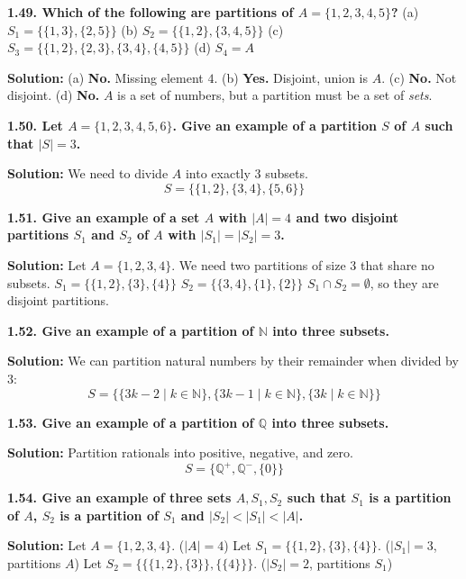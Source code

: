 \documentclass[12pt]{article}
\begin{document}
\hrulefill

\textbf{1.49. Which of the following are partitions of $A = \{1, 2, 3, 4, 5\}$?}
(a) $S_1 = \{\{1, 3\}, \{2, 5\}\}$ \quad (b) $S_2 = \{\{1, 2\}, \{3, 4, 5\}\}$
(c) $S_3 = \{\{1, 2\}, \{2, 3\}, \{3, 4\}, \{4, 5\}\}$ \quad (d) $S_4 = A$

\textbf{Solution:}
(a) \textbf{No.} Missing element $4$.
(b) \textbf{Yes.} Disjoint, union is $A$.
(c) \textbf{No.} Not disjoint.
(d) \textbf{No.} $A$ is a set of numbers, but a partition must be a set of \textit{sets}.

\hrulefill

\textbf{1.50. Let $A = \{1, 2, 3, 4, 5, 6\}$. Give an example of a partition $S$ of $A$ such that $|S| = 3$.}

\textbf{Solution:}
We need to divide $A$ into exactly 3 subsets. 
\[ S = \{\{1, 2\}, \{3, 4\}, \{5, 6\}\} \]

\hrulefill

\textbf{1.51. Give an example of a set $A$ with $|A| = 4$ and two disjoint partitions $S_1$ and $S_2$ of $A$ with $|S_1| = |S_2| = 3$.}

\textbf{Solution:}
Let $A = \{1, 2, 3, 4\}$. We need two partitions of size 3 that share no subsets.
$S_1 = \{\{1, 2\}, \{3\}, \{4\}\}$
$S_2 = \{\{3, 4\}, \{1\}, \{2\}\}$
$S_1 \cap S_2 = \emptyset$, so they are disjoint partitions.

\hrulefill

\textbf{1.52. Give an example of a partition of $\mathbb{N}$ into three subsets.}

\textbf{Solution:}
We can partition natural numbers by their remainder when divided by 3:
\[ S = \{\{3k-2 \mid k \in \mathbb{N}\}, \{3k-1 \mid k \in \mathbb{N}\}, \{3k \mid k \in \mathbb{N}\}\} \]

\hrulefill

\textbf{1.53. Give an example of a partition of $\mathbb{Q}$ into three subsets.}

\textbf{Solution:}
Partition rationals into positive, negative, and zero.
\[ S = \{\mathbb{Q}^+, \mathbb{Q}^-, \{0\}\} \]

\hrulefill

\textbf{1.54. Give an example of three sets $A, S_1, S_2$ such that $S_1$ is a partition of $A$, $S_2$ is a partition of $S_1$ and $|S_2| < |S_1| < |A|$.}

\textbf{Solution:}
Let $A = \{1, 2, 3, 4\}$. ($|A| = 4$)
Let $S_1 = \{\{1, 2\}, \{3\}, \{4\}\}$. ($|S_1| = 3$, partitions $A$)
Let $S_2 = \{\{\{1, 2\}, \{3\}\}, \{\{4\}\}\}$. ($|S_2| = 2$, partitions $S_1$)
\end{document}
